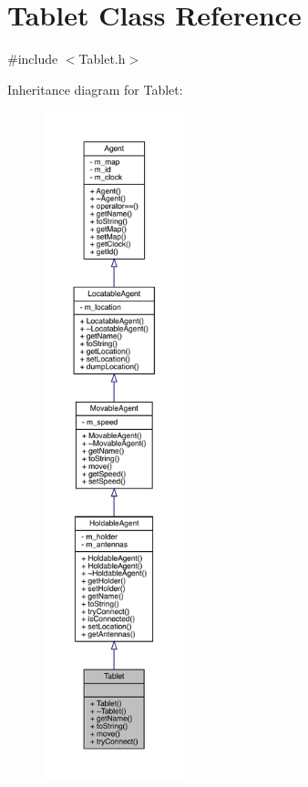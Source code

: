 \hypertarget{class_tablet}{}\section{Tablet Class Reference}
\label{class_tablet}


{\ttfamily \#include $<$Tablet.\+h$>$}



Inheritance diagram for Tablet\+:\nopagebreak
\begin{figure}[H]
\begin{center}
\leavevmode
\includegraphics[height=550pt]{class_tablet__inherit__graph}
\end{center}
\end{figure}


